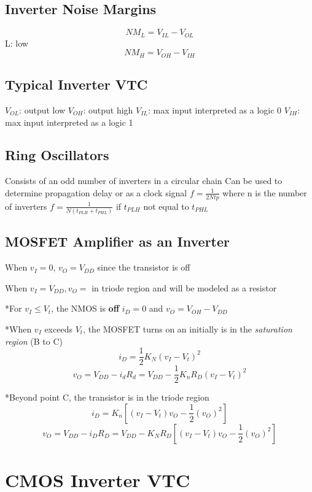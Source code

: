 \documentclass[12pt]{article}
\begin{document}
    \subsection*{Inverter Noise Margins}

    $$NM_L = V_{IL} - V_{OL}$$
    L: low
    $$NM_H = V_{OH} - V_{IH}$$

    \subsection*{Typical Inverter VTC}

    $V_{OL}$: output low
    $V_{OH}$: output high
    $V_{IL}$: max input interpreted as a logic 0
    $V_{IH}$: max input interpreted as a logic 1

    \subsection*{Ring Oscillators}

    Consists of an odd number of inverters in a circular chain
    Can be used to determine propagation delay or as a clock signal
    $f = \frac{1}{2Ntp}$ where n is the number of inverters
    $f = \frac{1}{N(t_{PLH} + t_{PHL})}$ if $t_{PLH}$ not equal to $t_{PHL}$

    \subsection*{MOSFET Amplifier as an Inverter}

    When $v_I = 0$, $v_O = V_{DD}$ since the transistor is off

    When $v_I = V_{DD}, v_O =$
    in triode region and will be modeled as a resistor

    *For $v_I \leq V_t$, the NMOS is \textbf{off}
    $i_D = 0$ and $v_O = V_{OH} - V_{DD}$

    *When $v_I$ exceeds $V_t$, the MOSFET turns on an initially is in the \textit{saturation region} (B to C)
    $$i_D = \frac{1}{2}K_N(v_I - V_t)^2$$
    $$v_O = V_{DD} - i_dR_d = V_{DD} - \frac{1}{2}K_nR_D(v_I - V_t)^2$$

    *Beyond point C, the transistor is in the triode region
    $$i_D = K_n[(v_I - V_t)v_O - \frac{1}{2}(v_O)^2]$$
    $$v_O = V_{DD} - i_DR_D = V_{DD} - K_NR_D[(v_I - V_t)v_O - \frac{1}{2}(v_O)^2]$$

    \section{CMOS Inverter VTC}
\end{document}
